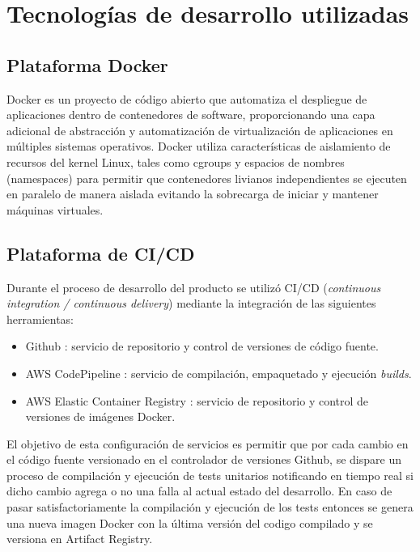 \section{Tecnologías de desarrollo utilizadas}




\subsection{Plataforma Docker}

Docker \cite{docker_website} es un proyecto de código abierto que automatiza el despliegue de aplicaciones dentro de contenedores de software, proporcionando una capa adicional de abstracción y automatización de virtualización de aplicaciones en múltiples sistemas operativos. Docker utiliza características de aislamiento de recursos del kernel Linux, tales como cgroups y espacios de nombres (namespaces) para permitir que contenedores livianos independientes se ejecuten en paralelo de manera aislada evitando la sobrecarga de iniciar y mantener máquinas virtuales.




\subsection{Plataforma de CI/CD}
Durante el proceso de desarrollo del producto se utilizó CI/CD (\textit{continuous integration / continuous delivery}) mediante la integración de las siguientes herramientas:

\begin{itemize}
	\item Github \cite{SoftwareTool_Github}: servicio de repositorio y control de versiones de código fuente.
	\item AWS CodePipeline \cite{SoftwareTool_codePipeline}: servicio de compilación, empaquetado y ejecución \textit{builds}.
	\item AWS Elastic Container Registry \cite{SoftwareTool_ECR}: servicio de repositorio y control de versiones de imágenes Docker.
\end{itemize}

El objetivo de esta configuración de servicios es permitir que por cada cambio en el código fuente versionado en el controlador de versiones Github, se dispare un proceso de compilación y ejecución de tests unitarios notificando en tiempo real si dicho cambio agrega o no una falla al actual estado del desarrollo. En caso de pasar satisfactoriamente la compilación y ejecución de los tests entonces se genera una nueva imagen Docker con la última versión del codigo compilado y se versiona en Artifact Registry.

